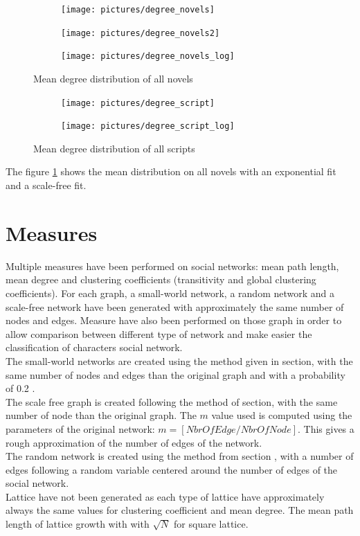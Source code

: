\documentclass[a4paper, 12pt]{report}
\begin{document}
\begin{figure}
\begin{subfigure}{.30\textwidth}
\centering
\texttt{[image: pictures/degree\_novels]}
\end{subfigure}
\hfill
\begin{subfigure}{.30\textwidth}
\centering
\texttt{[image: pictures/degree\_novels2]}
\end{subfigure}
\hfill
\begin{subfigure}{.30\textwidth}
\centering
\texttt{[image: pictures/degree\_novels\_log]}
\end{subfigure}

\caption{Mean degree distribution of all novels}
\label{cumulated_degree_novel}
\end{figure}

\begin{figure}
\begin{subfigure}{.49\textwidth}
\centering
\texttt{[image: pictures/degree\_script]}
\end{subfigure}
\hfill
\begin{subfigure}{.49\textwidth}
\centering
\texttt{[image: pictures/degree\_script\_log]}
\end{subfigure}
\caption{Mean degree distribution of all scripts}
\label{cumulated_degree_script}
\end{figure}

The figure \ref{cumulated_degree_novel} shows the mean distribution on all novels with an exponential fit and a scale-free fit.
\section{Measures}
Multiple measures have been performed on social networks: mean path length, mean degree and clustering coefficients (transitivity and global clustering coefficients). For each graph, a small-world network, a random network and a scale-free network have been generated with approximately the same number of nodes and edges. Measure have also been performed on those graph in order to allow comparison between different type of network and make easier the classification of characters social network.\\

The small-world networks are created using the method given in section, with the same number of nodes and edges than the original graph and with a probability of 0.2 .\\
The scale free graph is created following the method of section, with the same number of node than the original graph. The $m$ value used is computed using the parameters of the original network: $m = [NbrOfEdge / NbrOfNode]$. This gives a rough approximation of the number of edges of the network.\\
The random network is created using the method from section , with a number of edges following a random variable centered around the number of edges of the social network.\\
Lattice have not been generated as each type of lattice have approximately always the same values for clustering coefficient and mean degree. The mean path length of lattice growth with with $\sqrt{N}$ for square lattice.
\end{document}
